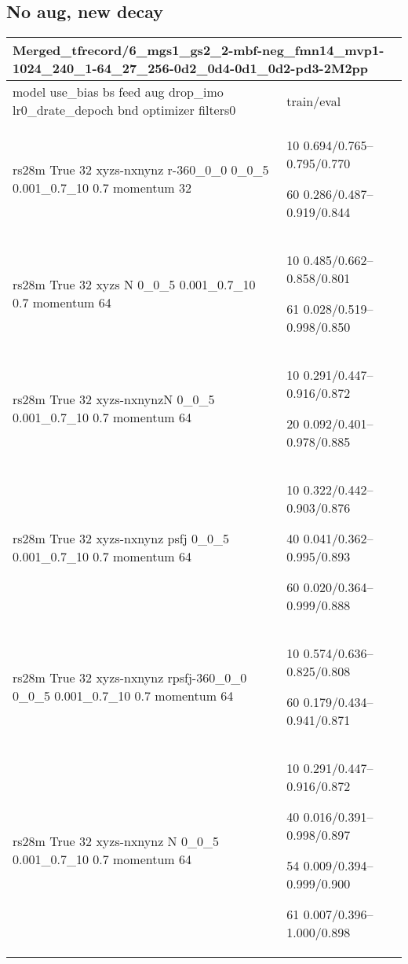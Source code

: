 \documentclass[,table,dvipsnames]{article}
\begin{document}
\subsection{No aug, new decay}
\noindent\begin{tabular}{|p{10cm}|p{5cm}| }	
	\hline
	\multicolumn{2}{|p{15cm}|}{Merged\_tfrecord/6\_mgs1\_gs2\_2-mbf-neg\_fmn14\_mvp1-1024\_240\_1-64\_27\_256-0d2\_0d4-0d1\_0d2-pd3-2M2pp}\\
	\hline
	model use\_bias bs feed aug drop\_imo lr0\_drate\_depoch bnd optimizer filters0 & train/eval \\
	
	\rowcolor{orange!20}
	rs28m True 32 xyzs-nxnynz r-360\_0\_0 0\_0\_5 0.001\_0.7\_10 0.7 momentum 32& 10 0.694/0.765--0.795/0.770\par60 0.286/0.487--0.919/0.844\\ 
	
	\rowcolor{blue!20}
	rs28m True 32 xyzs N 0\_0\_5 0.001\_0.7\_10 0.7 momentum 64&
	10 0.485/0.662--0.858/0.801\par 61 0.028/0.519--0.998/0.850\\
	
	\rowcolor{green!20}
	rs28m True 32 xyzs-nxnynzN 0\_0\_5 0.001\_0.7\_10 0.7 momentum 64&
	10 0.291/0.447--0.916/0.872\par 20 0.092/0.401--0.978/0.885\\
	
	\rowcolor{yellow}
	rs28m True 32 xyzs-nxnynz psfj 0\_0\_5 0.001\_0.7\_10 0.7 momentum 64& 10 0.322/0.442--0.903/0.876\par 40 0.041/0.362--0.995/0.893\par 60 0.020/0.364--0.999/0.888\\
	
	\rowcolor{orange!20}
	rs28m True 32 xyzs-nxnynz rpsfj-360\_0\_0 0\_0\_5 0.001\_0.7\_10 0.7 momentum 64& 10 0.574/0.636--0.825/0.808\par 60 0.179/0.434--0.941/0.871\\
	
	\rowcolor{green}
	rs28m True 32 xyzs-nxnynz N 0\_0\_5 0.001\_0.7\_10 0.7 momentum 64&
	10 0.291/0.447--0.916/0.872\par 40 0.016/0.391--0.998/0.897\par 54 0.009/0.394--0.999/0.900\par 61 0.007/0.396--1.000/0.898\\
	\hline 
\end{tabular}
\end{document}
